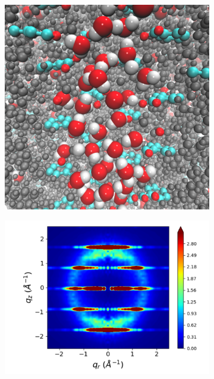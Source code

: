 \documentclass[journal=jpcbfk,manuscript=article]{achemso}
\begin{document}
\begin{figure}[!htb]
\begin{subfigure}{0.3\linewidth}
	\label{fig:staggered}
  \end{subfigure}
  \begin{subfigure}{0.3\linewidth}
  	\centering
  	\includegraphics[width=\textwidth]{solvated_pore_cross_section.pdf}  %
  	\label{fig:solvated_pore}
  \end{subfigure}
  \begin{subfigure}{0.3\linewidth}
  	\centering
  	\includegraphics[width=\textwidth]{rotated_monomers_rzplot_restrained.pdf}

\end{subfigure}
\end{figure}
\end{document}
